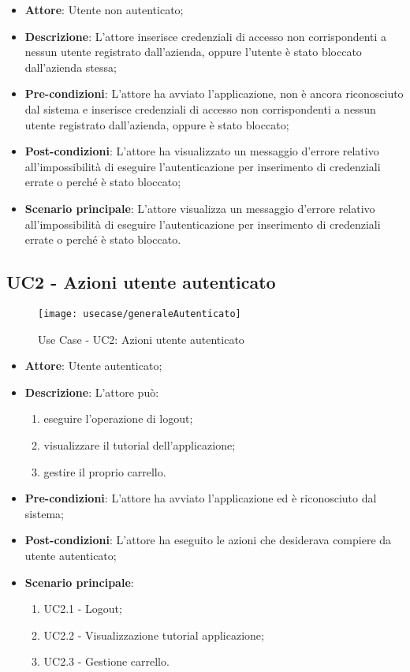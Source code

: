 \begin{itemize}
	\item \textbf{Attore}: Utente non autenticato;
	\item \textbf{Descrizione}: L'attore inserisce credenziali di accesso non corrispondenti a nessun utente registrato dall'azienda, oppure l'utente è stato bloccato dall'azienda stessa;
	\item \textbf{Pre-condizioni}: L'attore ha avviato l'applicazione, non è ancora riconosciuto dal sistema e inserisce credenziali di accesso non corrispondenti a nessun utente registrato dall'azienda, oppure è stato bloccato;
	\item \textbf{Post-condizioni}: L'attore ha visualizzato un messaggio d'errore relativo all'impossibilità di eseguire l'autenticazione per inserimento di credenziali errate o perché è stato bloccato;
	\item \textbf{Scenario principale}: L'attore visualizza un messaggio d'errore relativo all'impossibilità di eseguire l'autenticazione per inserimento di credenziali errate o perché è stato bloccato.
\end{itemize}

\newpage

\subsection{UC2 - Azioni utente autenticato}

\begin{figure}[!h] 
    \centering 
    \texttt{[image: usecase/generaleAutenticato]} 
    \caption{Use Case - UC2: Azioni utente autenticato}
\end{figure}

\begin{itemize}
	\item \textbf{Attore}: Utente autenticato;
	\item \textbf{Descrizione}: L'attore può:
	\begin{enumerate}
		\item eseguire l'operazione di logout;
		\item visualizzare il tutorial dell'applicazione;
		\item gestire il proprio carrello. 
	\end{enumerate}
	\item \textbf{Pre-condizioni}: L'attore ha avviato l'applicazione ed è riconosciuto dal sistema;
	\item \textbf{Post-condizioni}: L'attore ha eseguito le azioni che desiderava compiere da utente autenticato;
	\item \textbf{Scenario principale}: 
		\begin{enumerate}
			\item UC2.1 - Logout;
			\item UC2.2 - Visualizzazione tutorial applicazione;
			\item UC2.3 - Gestione carrello.
		\end{enumerate}
\end{itemize}

